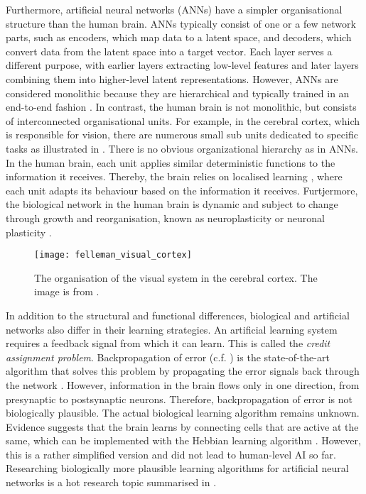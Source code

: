 Furthermore, artificial neural networks (ANNs) have a simpler organisational structure than the human brain. ANNs typically consist of one or a few network parts, such as encoders, which map data to a latent space, and decoders, which convert data from the latent space into a target vector. Each layer serves a different purpose, with earlier layers extracting low-level features and later layers combining them into higher-level latent representations. However, ANNs are considered monolithic because they are hierarchical and typically trained in an end-to-end fashion \cite{glasmachers_limits_2017}. In contrast, the human brain is not monolithic, but consists of interconnected organisational units. For example, in the cerebral cortex, which is responsible for vision, there are numerous small sub units dedicated to specific tasks as illustrated in . There is no obvious organizational hierarchy as in ANNs. In the human brain, each unit applies similar deterministic functions to the information it receives. Thereby, the brain relies on localised learning \cite{lillicrap_backpropagation_2020}, where each unit adapts its behaviour based on the information it receives. Furtjermore, the biological network in the human brain is dynamic and subject to change through growth and reorganisation, known as neuroplasticity or neuronal plasticity .

\begin{figure}[h]
    \centering
    \texttt{[image: felleman\_visual\_cortex]}
    \caption[Organization of the visual system in the cerebral cortex]{The organisation of the visual system in the cerebral cortex. The image is from .}
\end{figure}

In addition to the structural and functional differences, biological and artificial networks also differ in their learning strategies.
An artificial learning system requires a feedback signal from which it can learn.
This is called the \emph{credit assignment problem}.
Backpropagation of error (c.f. ) is the state-of-the-art algorithm that solves this problem by propagating the error signals back through the network .
However, information in the brain flows only in one direction, from presynaptic to postsynaptic neurons.
Therefore, backpropagation of error is not biologically plausible.
The actual biological learning algorithm remains unknown. Evidence suggests that the brain learns by connecting cells that are active at the same, which can be implemented with the Hebbian learning algorithm . However, this is a rather simplified version and did not lead to human-level AI so far.
Researching biologically more plausible learning algorithms for artificial neural networks is a hot research topic summarised in .

